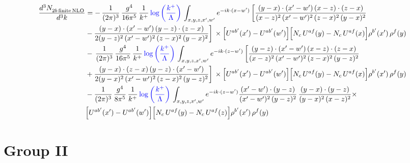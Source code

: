 \documentclass[9pt]{article}
\numberwithin{equation}{section}
\begin{document}
\begin{align}
    \frac{d^{3}N_{2b\,\rm finite\, NLO}^{\rm}}{d^{3}k} & =  -\, \frac{1}{(2\pi)^{3}}\,\frac{g^{4}}{16\pi^{5}}\,\frac{1}{k^{+}}\,{\color{blue}\log{\left(\frac{k^{+}}{\Lambda}\right)}}\,\int_{x,y,z,x',w'}e^{-ik\cdot(x-w')}\, \bigg[\frac{(y-x)\cdot (x'-w')\,(x-z)\cdot (z-x)}{(x-z)^{2}\,(x'-w')^{2}\,(z-x)^{2}\,(y-x)^{2}}\notag \\ & -\frac{(y-x)\cdot (x'-w')\,(y-z)\cdot (z-x)}{2(y-z)^{2}\,(x'-w')^{2}\,(z-x)^{2}\,(y-x)^{2}}\bigg]\,\times \Big[U^{ab'}(x')-U^{ab'}(w')\Big]\Big[N_{c}\,U^{af}(y)-N_{c}\,U^{af}(x)\Big]\rho^{b'}(x')\,\rho^{f}(y)\notag \\ & -\, \frac{1}{(2\pi)^{3}}\,\frac{g^{4}}{16\pi^{5}}\,\frac{1}{k^{+}}\,{\color{blue}\log{\left(\frac{k^{+}}{\Lambda}\right)}}\,\int_{x,y,z,x',w'}e^{-ik\cdot(z-w')}\,\bigg[\frac{(y-z)\cdot (x'-w')\,(x-z)\cdot (z-x)}{(x-z)^{2}\,(x'-w')^{2}\,(z-x)^{2}\,(y-z)^{2}}\notag \\ & +\frac{(y-x)\cdot (z-x)\,(y-z)\cdot (x'-w')}{2(y-x)^{2}\,(x'-w')^{2}\,(z-x)^{2}\,(y-z)^{2}}\bigg]\,\times \Big[U^{ab'}(x')-U^{ab'}(w')\Big]\Big[N_{c}\,U^{af}(y)-N_{c}\,U^{af}(x)\Big]\rho^{b'}(x')\,\rho^{f}(y)\notag \\ & - \frac{1}{(2\pi)^{3}}\,\frac{g^{4}}{8\pi^{5}}\,\frac{1}{k^{+}}\,{\color{blue}\log{\left(\frac{k^{+}}{\Lambda}\right)}}\,\int_{x,y,z,x',w'}e^{-ik\cdot(z-w')} \frac{(x'-w')\cdot(y-z)}{(x'-w')^{2}\,(y-z)^{2}}\,\frac{(y-x)\cdot(y-z)}{(y-x)^{2}\,(x-z)^{2}}\times\notag \\ & \Big[U^{ab'}(x')-U^{ab'}(w')\Big]\Big[N_{c}\,U^{af}(y)-N_{c}\,U^{af}(z)\Big]\rho^{b'}(x')\,\rho^{f}(y)
\end{align}
\section{Group II}
\end{document}
